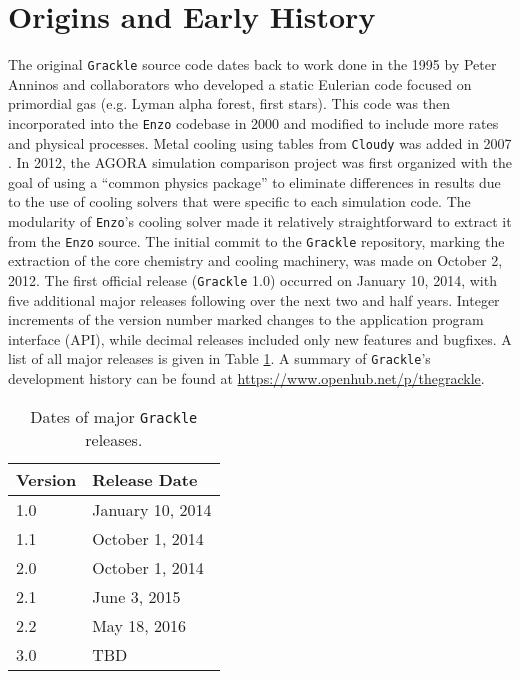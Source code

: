 \section{Origins and Early History}
\label{sec:origins}

The original \texttt{Grackle} source code dates back to work done in
the 1995 by Peter Anninos and collaborators
\citep{1997NewA....2..209A} who developed a static Eulerian code
focused on primordial gas (e.g. Lyman alpha forest, first stars).
This code was then incorporated into the \texttt{Enzo} codebase in 2000
and modified to include more rates and physical processes.  Metal
cooling using tables from \texttt{Cloudy} was added in 2007
\citep{2008MNRAS.385.1443S}.  In 2012, the AGORA simulation comparison
project \citep{2014ApJS..210...14K} was first organized with the goal
of using a ``common physics package'' to eliminate differences in
results due to the use of cooling solvers that were specific to each
simulation code.  The modularity of \texttt{Enzo}'s cooling solver made
it relatively straightforward to extract it from the \texttt{Enzo}
source.  The initial commit to the \texttt{Grackle} repository,
marking the extraction of the core chemistry and cooling machinery,
was made on October 2, 2012.  The first official release
(\texttt{Grackle} 1.0) occurred on January 10, 2014, with five
additional major releases following over the next two and half years.
Integer increments of the version number marked changes to the
application program interface (API), while decimal releases included
only new features and bugfixes.  A list of all major releases is given
in Table \ref{tab:releases}.  A summary of \texttt{Grackle}'s
development history can be found at
\url{https://www.openhub.net/p/thegrackle}.

\begin{table}
  \centering
  \caption{Dates of major \texttt{Grackle} releases.}
  \label{tab:releases}
  \begin{tabular}{ll}
    \hline
    Version & Release Date\\
    \hline
    1.0 & January 10, 2014\\
    1.1 & October 1, 2014\\
    2.0 & October 1, 2014\\
    2.1 & June 3, 2015\\
    2.2 & May 18, 2016\\
    3.0 & TBD\\
    \hline
  \end{tabular}
\end{table}
